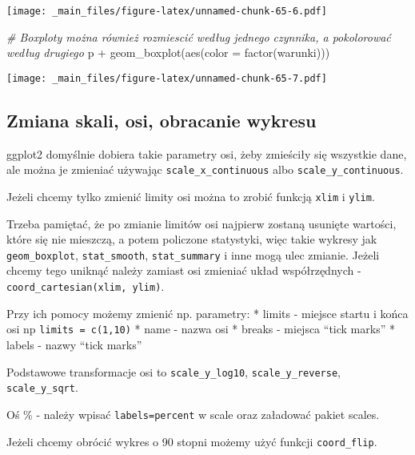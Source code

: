 \documentclass[
]{book}
\newenvironment{Shaded}{\begin{snugshade}}{\end{snugshade}}
\newcommand{\AttributeTok}[1]{\textcolor[rgb]{0.77,0.63,0.00}{#1}}
\newcommand{\CommentTok}[1]{\textcolor[rgb]{0.56,0.35,0.01}{\textit{#1}}}
\newcommand{\FunctionTok}[1]{\textcolor[rgb]{0.00,0.00,0.00}{#1}}
\newcommand{\NormalTok}[1]{#1}
\newcommand{\SpecialCharTok}[1]{\textcolor[rgb]{0.00,0.00,0.00}{#1}}
\begin{document}
\texttt{[image: \_main\_files/figure-latex/unnamed-chunk-65-6.pdf]}

\begin{Shaded}
\begin{Highlighting}[]
\CommentTok{\# Boxploty można również rozmiescić według jednego czynnika, a pokolorować według drugiego}
\NormalTok{p }\SpecialCharTok{+} \FunctionTok{geom\_boxplot}\NormalTok{(}\FunctionTok{aes}\NormalTok{(}\AttributeTok{color =} \FunctionTok{factor}\NormalTok{(warunki)))}
\end{Highlighting}
\end{Shaded}

\texttt{[image: \_main\_files/figure-latex/unnamed-chunk-65-7.pdf]}

\hypertarget{zmiana-skali-osi-obracanie-wykresu}{%
\subsection{Zmiana skali, osi, obracanie wykresu}\label{zmiana-skali-osi-obracanie-wykresu}}

ggplot2 domyślnie dobiera takie parametry osi, żeby zmieściły się wszystkie dane, ale można je zmieniać używając \texttt{scale\_x\_continuous} albo \texttt{scale\_y\_continuous}.

Jeżeli chcemy tylko zmienić limity osi można to zrobić funkcją \texttt{xlim} i \texttt{ylim}.

Trzeba pamiętać, że po zmianie limitów osi najpierw zostaną usunięte wartości, które się nie mieszczą, a potem policzone statystyki, więc takie wykresy jak \texttt{geom\_boxplot}, \texttt{stat\_smooth}, \texttt{stat\_summary} i inne mogą ulec zmianie. Jeżeli chcemy tego uniknąć należy zamiast osi zmieniać układ współrzędnych - \texttt{coord\_cartesian(xlim,\ ylim)}.

Przy ich pomocy możemy zmienić np. parametry:
* limits - miejsce startu i końca osi np \texttt{limits\ =\ c(1,10)}
* name - nazwa osi
* breaks - miejsca ``tick marks''
* labels - nazwy ``tick marks''

Podstawowe transformacje osi to \texttt{scale\_y\_log10}, \texttt{scale\_y\_reverse}, \texttt{scale\_y\_sqrt}.

Oś \% - należy wpisać \texttt{labels=percent} w scale oraz załadować pakiet scales.

Jeżeli chcemy obrócić wykres o 90 stopni możemy użyć funkcji \texttt{coord\_flip}.
\end{document}
